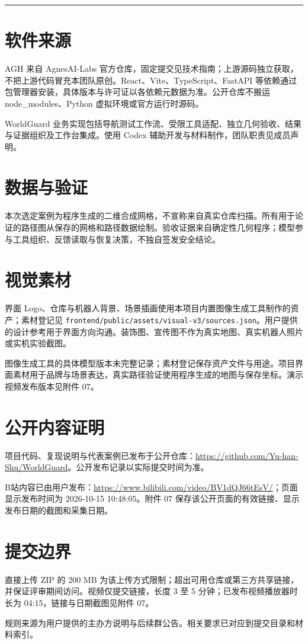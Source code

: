 \documentclass[UTF8,10pt,a4paper]{ctexart}
\newcommand{\cover}[2]{\vspace*{5mm}{\small\textcolor{teal}{WORLDGUARD / SUBMISSION 2026}}\par\vspace{4mm}{\huge\bfseries\color{ink}#1}\par\vspace{3mm}{\large #2}\par\vspace{4mm}\hrule\vspace{5mm}}
\begin{document}
\cover{第三方资源与 AI 使用说明}{软件、数据、视觉素材与公开证据口径}
\section{软件来源}
AGH 来自 AgnesAI-Labs 官方仓库，固定提交见技术指南；上游源码独立获取，不把上游代码冒充本团队原创。React、Vite、TypeScript、FastAPI 等依赖通过包管理器安装，具体版本与许可证以各依赖元数据为准。公开仓库不搬运 node\_modules、Python 虚拟环境或官方运行时源码。

WorldGuard 业务实现包括导航测试工作流、受限工具适配、独立几何验收、结果与证据组织及工作台集成。使用 Codex 辅助开发与材料制作，团队职责见成员声明。
\section{数据与验证}
本次选定案例为程序生成的二维合成网格，不宣称来自真实仓库扫描。所有用于论证的路径图从保存的网格和路径数据绘制。验收证据来自确定性几何程序；模型参与工具组织、反馈读取与恢复决策，不独自签发安全结论。
\section{视觉素材}
界面 Logo、仓库与机器人背景、场景插画使用本项目内置图像生成工具制作的资产；素材登记见 \nolinkurl{frontend/public/assets/visual-v3/sources.json}。用户提供的设计参考用于界面方向沟通。装饰图、宣传图不作为真实地图、真实机器人照片或实机实验截图。

图像生成工具的具体模型版本未完整记录；素材登记保存资产文件与用途。项目界面素材用于品牌与场景表达，真实路径验证使用程序生成的地图与保存坐标。演示视频发布版本见附件 07。
\section{公开内容证明}
项目代码、复现说明与代表案例已发布于公开仓库：\url{https://github.com/Yu-han-Shu/WorldGuard}。公开发布记录以实际提交时间为准。

B站内容已由用户发布：\url{https://www.bilibili.com/video/BV1dQJ66tEsV/}；页面显示发布时间为 2026-10-15 10:48:05。附件 07 保存该公开页面的有效链接、显示发布日期的截图和采集日期。
\section{提交边界}
直接上传 ZIP 的 200 MB 为该上传方式限制；超出可用仓库或第三方共享链接，并保证评审期间访问。视频仅提交链接，长度 3 至 5 分钟；已发布视频播放器时长为 04:15，链接与日期截图见附件 07。

规则来源为用户提供的主办方说明与后续群公告。相关要求已对应到提交目录和材料索引。
\end{document}
